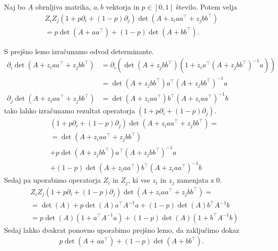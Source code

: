 \begin{lema}\label{zizj-odvod-determinante}
    Naj bo \(A\) obrnljiva matrika, \(a,b\) vektorja in \(p\in [0,1]\) število. Potem velja
    \begin{align*}
        Z_iZ_j(1+p\partial_i + (1-p)\partial_j)\det(A + z_i aa^\top+ z_j bb^\top) \\
        = p\det(A + aa^\top) + (1-p)\det(A+bb^\top).
    \end{align*}
\end{lema}
\begin{dokaz}
    S prejšno lemo izračunamo odvod determinante.
    \begin{align*}
        \partial_i \det(A + z_i aa^\top +z_j bb^\top) & =\partial_i \left(\det(A + z_j bb^\top) (1+ z_i a^\top (A + z_j bb^\top)^{-1} a)\right) \\
                                                      & = \det(A + z_j bb^\top) a^\top (A + z_j bb^\top)^{-1} a                                 \\
        \partial_j \det(A + z_i aa^\top +z_j bb^\top) & = \det(A + z_i aa^\top) b^\top (A + z_i aa^\top)^{-1} b
    \end{align*}
    tako lahko izračunamo rezultat operatorja \((1+p\partial_i + (1-p)\partial_j)\).
    \begin{align*}
         & (1+p\partial_i + (1-p)\partial_j)\det(A + z_i aa^\top + z_j bb^\top) = \\
         & = \det(A + z_i aa^\top + z_j bb^\top)                                  \\
         & + p\det(A + z_j bb^\top) a^\top (A + z_j bb^\top)^{-1} a               \\
         & + (1-p)\det(A + z_i aa^\top) b^\top (A + z_i aa^\top)^{-1} b
    \end{align*}
    Sedaj pa uporabimo operatorja \(Z_i\) in \(Z_j\), ki vse \(z_i\) in \(z_j\) zamenjata z \(0\).
    \begin{align*}
         & Z_iZ_j(1+p\partial_i + (1-p)\partial_j)\det(A + z_i aa^\top+ z_j bb^\top) = \\
         & =\det(A) + p\det(A) a^\top A^{-1} a + (1-p)\det(A) b^\top A^{-1} b          \\
         & = p \det(A)(1+ a^\top A^{-1}a) + (1-p)\det(A)(1+b^\top A^{-1} b)
    \end{align*}
    Sedaj lahko dvakrat ponovno uporabimo prejšno lemo, da zaključimo dokaz
    \begin{align*}
        p \det(A + aa^\top) + (1-p)\det(A+bb^\top).
    \end{align*}
\end{dokaz}

